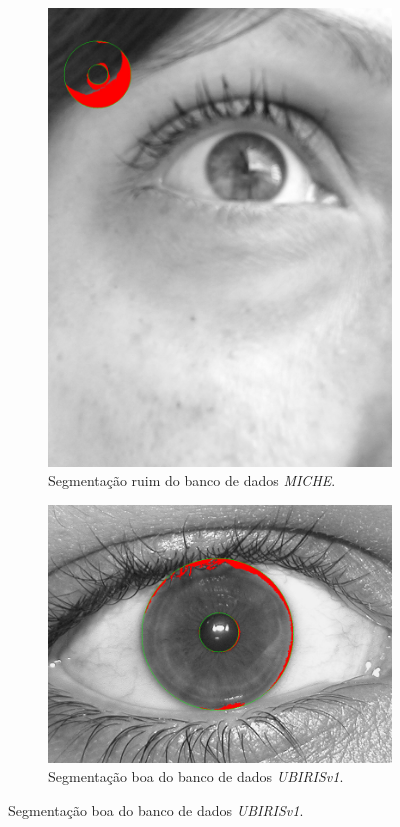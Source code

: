 \begin{figure}[H]
\begin{subfigure}{0.25\textwidth}
  \includegraphics[width=\linewidth]{img/Resultados/miche/miche_seg_ruim.jpg}
  \caption{Segmentação ruim do banco de dados \textit{MICHE}.}
\end{subfigure}\hfil %
\begin{subfigure}{0.25\textwidth}
  \includegraphics[width=\linewidth]{img/Resultados/ubirisv1/ubirisv1_seg_boa.jpg}
  \caption{Segmentação boa do banco de dados \textit{UBIRISv1}.}
\end{subfigure}


\end{figure}
